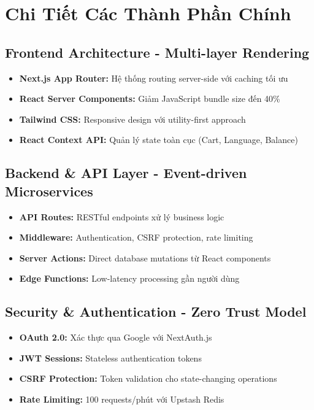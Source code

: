 \documentclass[12pt,a4paper]{article}
\begin{document}
\section{Chi Tiết Các Thành Phần Chính}

\subsection{Frontend Architecture - Multi-layer Rendering}
\begin{itemize}[leftmargin=*]
    \item \textbf{Next.js App Router:} Hệ thống routing server-side với caching tối ưu
    \item \textbf{React Server Components:} Giảm JavaScript bundle size đến 40\%
    \item \textbf{Tailwind CSS:} Responsive design với utility-first approach
    \item \textbf{React Context API:} Quản lý state toàn cục (Cart, Language, Balance)
\end{itemize}

\subsection{Backend \& API Layer - Event-driven Microservices}
\begin{itemize}[leftmargin=*]
    \item \textbf{API Routes:} RESTful endpoints xử lý business logic
    \item \textbf{Middleware:} Authentication, CSRF protection, rate limiting
    \item \textbf{Server Actions:} Direct database mutations từ React components
    \item \textbf{Edge Functions:} Low-latency processing gần người dùng
\end{itemize}

\subsection{Security \& Authentication - Zero Trust Model}
\begin{itemize}[leftmargin=*]
    \item \textbf{OAuth 2.0:} Xác thực qua Google với NextAuth.js
    \item \textbf{JWT Sessions:} Stateless authentication tokens
    \item \textbf{CSRF Protection:} Token validation cho state-changing operations
    \item \textbf{Rate Limiting:} 100 requests/phút với Upstash Redis
\end{itemize}
\end{document}
